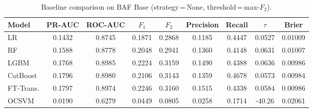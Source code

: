 \begin{table}[H]
\centering
\caption{Baseline comparison on BAF Base (strategy\,=\,None, threshold\,=\,max-$F_2$).}
\label{tab:baseline_baf}
\begin{tabular}{l c c c c c c c c}
\toprule
Model & PR-AUC & ROC-AUC & $F_1$ & $F_2$ & Precision & Recall & $\tau$ & Brier \\
\midrule
LR         & 0.1432 & 0.8745 & 0.1871 & 0.2868 & 0.1185 & 0.4447 & 0.0527 & 0.01009 \\
RF         & 0.1588 & 0.8778 & 0.2048 & 0.2941 & 0.1360 & 0.4148 & 0.0631 & 0.01007 \\
LGBM       & 0.1768 & 0.8985 & 0.2224 & 0.3159 & 0.1490 & 0.4388 & 0.0636 & 0.00986 \\
CatBoost   & 0.1796 & 0.8980 & 0.2106 & 0.3143 & 0.1359 & 0.4678 & 0.0573 & 0.00984 \\
FT-Trans.  & 0.1797 & 0.8974 & 0.2246 & 0.3160 & 0.1515 & 0.4338 & 0.0584 & 0.00986 \\
OCSVM      & 0.0190 & 0.6279 & 0.0449 & 0.0805 & 0.0258 & 0.1714 & -40.26 & 0.02061 \\
\bottomrule
\end{tabular}
\end{table}